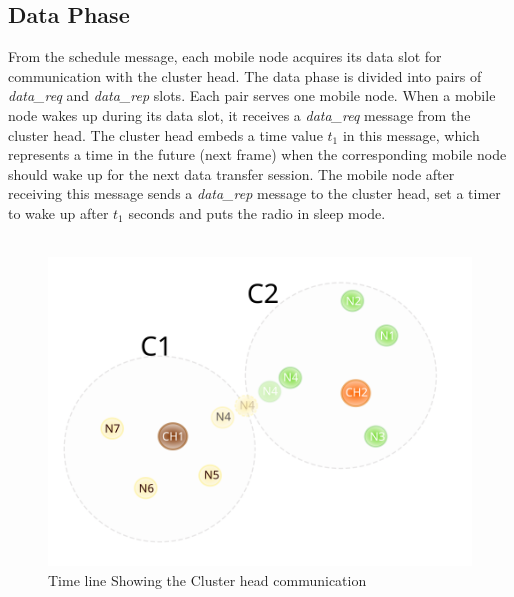 \documentclass[a4paper, conference, 10pt]{IEEEtran}
\begin{document}
\subsection{Data Phase}
\label{data_phase}

From the schedule message, each mobile node acquires its data slot for communication with the cluster head. The data phase is divided into pairs of \emph{data\_req} and \emph{data\_rep} slots. Each pair serves one mobile node. When a mobile node wakes up during its data slot, it receives a \emph{data\_req} message from the cluster head. The cluster head embeds a time value \emph{$t_1$} in this message, which represents a time in the future (next frame) when the corresponding mobile node should wake up for the next data transfer session. The mobile node after receiving this message sends a \emph{data\_rep} message to the cluster head, set a timer to wake up after \emph{$t_1$} seconds and puts the radio in sleep mode. \\\\

\begin{figure}[h]{} %
	\label{fig:scenario}
  \begin{center}
    \includegraphics[scale=0.6, natwidth=0.38\textwidth]{scenario01}
  \end{center}
  \caption{Time line Showing the Cluster head communication}
\end{figure}

\end{document}
